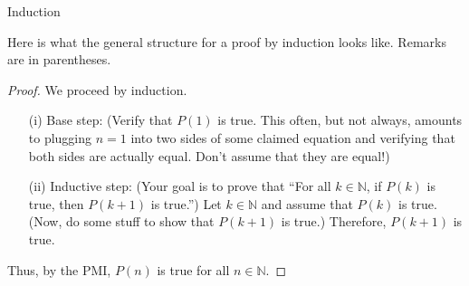 \begin{section}{Induction}
\begin{skeleton}
Here is what the general structure for a proof by induction looks like.  Remarks are in parentheses.

\bigskip

\begin{textbox}
\begin{proof}
We proceed by induction.
\begin{enumerate}
\item[(i)] Base step: (Verify that $P(1)$ is true.  This often, but not always, amounts to plugging $n=1$ into two sides of some claimed equation and verifying that both sides are actually equal.  Don't assume that they are equal!)

\item[(ii)] Inductive step:  (Your goal is to prove that ``For all $k\in\mathbb{N}$, if $P(k)$ is true, then $P(k+1)$ is true.'')  Let $k\in\mathbb{N}$ and assume that $P(k)$ is true.  (Now, do some stuff to show that $P(k+1)$ is true.)  Therefore, $P(k+1)$ is true.
\end{enumerate}
Thus, by the PMI, $P(n)$ is true for all $n\in\mathbb{N}$.
\end{proof}
\end{textbox}

\end{skeleton}

\end{section}